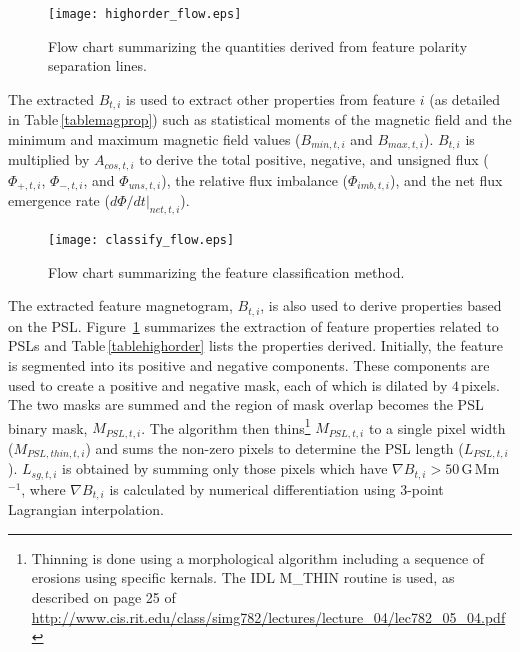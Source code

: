 \begin{figure}[!t]
\centerline{\texttt{[image: highorder\_flow.eps]}}
\caption[SMART characterisation method for PSLs.]{Flow chart summarizing the quantities derived from feature polarity separation lines.}\label{flow_highorder}
\end{figure}

The extracted $B_{t,i}$ is used to extract other properties from feature $i$ (as detailed in Table\,\ref{tablemagprop}) such as statistical moments of the magnetic field and the minimum and maximum magnetic field values ($B_{min,t,i}$ and $B_{max,t,i}$). $B_{t,i}$ is multiplied by $A_{cos,t,i}$ to derive the total positive, negative, and unsigned flux (${\Phi}_{+,t,i}$, ${\Phi}_{-,t,i}$, and ${\Phi}_{uns,t,i}$), the relative flux imbalance (${\Phi}_{imb,t,i}$), and the net flux emergence rate (${{d\Phi}/{dt}}|_{net,t,i}$).

\begin{figure}[!t]
\centerline{\texttt{[image: classify\_flow.eps]}}
\caption[The SMART classification method.]{Flow chart summarizing the feature classification method.}
\label{flow_class}
\end{figure}

The extracted feature magnetogram, $B_{t,i}$, is also used to derive properties based on the \gls{PSL}. Figure~\ref{flow_highorder} summarizes the extraction of feature properties related to \glspl{PSL} and Table\,\ref{tablehighorder} lists the properties derived. Initially, the feature is segmented into its positive and negative components. These components are used to create a positive and negative mask, each of which is dilated by $4$\,pixels. The two masks are summed and the region of mask overlap becomes the \gls{PSL} binary mask, $M_{PSL,t,i}$. The algorithm then thins\footnote{Thinning is done using a morphological algorithm including a sequence of erosions using specific kernals. The IDL M\_THIN routine is used, as described on page 25 of \url{http://www.cis.rit.edu/class/simg782/lectures/lecture_04/lec782\_05\_04.pdf}} $M_{PSL,t,i}$ to a single pixel width ($M_{PSL,thin,t,i}$) and sums the non-zero pixels to determine the \gls{PSL} length ($L_{PSL,t,i}$).  $L_{sg,t,i}$ is obtained by summing only those pixels which have $\nabla B_{t,i} > 50$\,G\,Mm$^{-1}$, where $\nabla B_{t,i}$ is calculated by numerical differentiation using 3-point Lagrangian interpolation. 

